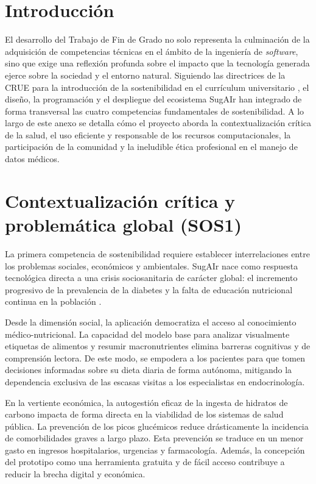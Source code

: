 
\section{Introducción}
El desarrollo del Trabajo de Fin de Grado no solo representa la culminación de la adquisición de competencias técnicas en el ámbito de la ingeniería de \textit{software}, sino que exige una reflexión profunda sobre el impacto que la tecnología generada ejerce sobre la sociedad y el entorno natural. Siguiendo las directrices de la CRUE para la introducción de la sostenibilidad en el currículum universitario \cite{crue2012}, el diseño, la programación y el despliegue del ecosistema SugAIr han integrado de forma transversal las cuatro competencias fundamentales de sostenibilidad. A lo largo de este anexo se detalla cómo el proyecto aborda la contextualización crítica de la salud, el uso eficiente y responsable de los recursos computacionales, la participación de la comunidad y la ineludible ética profesional en el manejo de datos médicos.

\section{Contextualización crítica y problemática global (SOS1)}
La primera competencia de sostenibilidad requiere establecer interrelaciones entre los problemas sociales, económicos y ambientales. SugAIr nace como respuesta tecnológica directa a una crisis sociosanitaria de carácter global: el incremento progresivo de la prevalencia de la diabetes y la falta de educación nutricional continua en la población \cite{idf2021}.

Desde la dimensión social, la aplicación democratiza el acceso al conocimiento médico-nutricional. La capacidad del modelo base para analizar visualmente etiquetas de alimentos y resumir macronutrientes elimina barreras cognitivas y de comprensión lectora. De este modo, se empodera a los pacientes para que tomen decisiones informadas sobre su dieta diaria de forma autónoma, mitigando la dependencia exclusiva de las escasas visitas a los especialistas en endocrinología.

En la vertiente económica, la autogestión eficaz de la ingesta de hidratos de carbono impacta de forma directa en la viabilidad de los sistemas de salud pública. La prevención de los picos glucémicos reduce drásticamente la incidencia de comorbilidades graves a largo plazo. Esta prevención se traduce en un menor gasto en ingresos hospitalarios, urgencias y farmacología. Además, la concepción del prototipo como una herramienta gratuita y de fácil acceso contribuye a reducir la brecha digital y económica.

